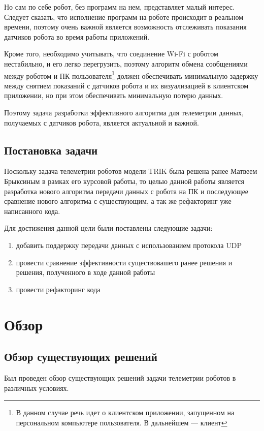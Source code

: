 \documentclass[14pt]{matmex-diploma-custom.cls}
\begin{document}
Но сам по себе робот, без программ на нем, представляет малый интерес. Следует сказать, что исполнение программ на роботе происходит в реальном времени, поэтому очень важной является возможность отслеживать показания датчиков робота во время работы приложений.

Кроме того, необходимо учитывать, что соединение Wi-Fi с роботом нестабильно, и его легко перегрузить, поэтому алгоритм обмена сообщениями между роботом и ПК пользователя\footnote{В данном случае речь идет о клиентском приложении, запущенном на персональном компьютере пользователя. В дальнейшем --- клиент} должен обеспечивать минимальную задержку между снятием показаний с датчиков робота и их визуализацией в клиентском приложении, но при этом обеспечивать минимальную потерю данных.

Поэтому задача разработки эффективного алгоритма для телеметрии данных, получаемых с датчиков робота, является актуальной и важной.

\subsection*{Постановка задачи}
Поскольку задача телеметрии роботов модели TRIK была решена ранее Матвеем Брыксиным в рамках его курсовой работы, то целью данной работы является разработка нового алгоритма передачи данных с робота на ПК и последующее сравнение нового алгоритма с существующим, а так же рефакторинг уже написанного кода.

Для достижения данной цели были поставлены следующие задачи:
\begin{enumerate}
\item добавить поддержку передачи данных с использованием протокола UDP

\item провести сравнение эффективности существовашего ранее решения и решения, полученного в ходе данной работы

\item провести рефакторинг кода
\end{enumerate}

\section{Обзор}

\subsection{Обзор существующих решений}
Был проведен обзор существующих решений задачи телеметрии роботов в различных условиях.
\end{document}
